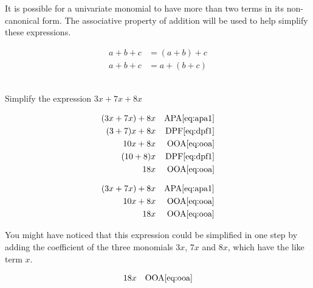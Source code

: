 It is possible for a univariate monomial to have more than two terms in its non-canonical form.  The associative property of addition will be used to help simplify these expressions.

\begin{definition}
\begin{subequations}
\begin{align}
a+b+c &= (a+b)+c \label{eq:apa1} \\
a+b+c &= a+(b+c) \label{eq:apa2}
\end{align}
\end{subequations}
\end{definition}

\begin{example}[id:20141121-184652] \label{20141121-184652} \hfill \\

Simplify the expression $3x+7x+8x$

\soln
\solnsteps
\begin{align*}
(3x+7x)+8x && \text{APA} \eqref{eq:apa1} \\
(3+7)x+8x && \text{DPF} \eqref{eq:dpf1} \\
10x+8x && \text{OOA} \eqref{eq:ooa} \\
(10+8)x && \text{DPF} \eqref{eq:dpf1} \\
18x && \text{OOA} \eqref{eq:ooa} 
\end{align*}

\soln

\lesssteps
\begin{align*}
(3x+7x)+8x && \text{APA} \eqref{eq:apa1} \\
10x+8x && \text{OOA} \eqref{eq:ooa} \\
18x && \text{OOA} \eqref{eq:ooa} 
\end{align*}

You might have noticed that this expression could be simplified in one step by adding the coefficient of the three monomials $3x$, $7x$ and $8x$, which have the like term $x$.\\

\soln

\lesssteps
\begin{align*}
18x && \text{OOA} \eqref{eq:ooa} 
\end{align*}

\end{example}

